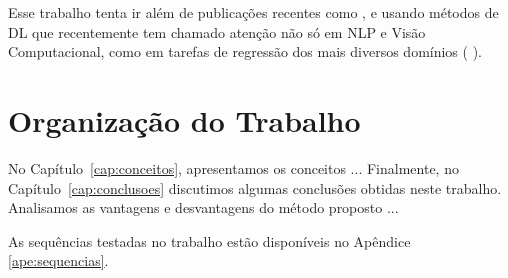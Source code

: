 Esse trabalho tenta ir além de publicações recentes como \citet{cementnn1}, \citet{cementnn2} e \citet{cementml} usando métodos de DL que recentemente tem chamado atenção não só em NLP e Visão Computacional, como em tarefas de regressão dos mais diversos domínios (\cite{ubertime} \cite{lstmbr} \cite{energylstm}). 

\section{Organização do Trabalho}
\label{sec:organizacao_trabalho}

No Capítulo~\ref{cap:conceitos}, apresentamos os conceitos ... Finalmente, no
Capítulo~\ref{cap:conclusoes} discutimos algumas conclusões obtidas neste
trabalho. Analisamos as vantagens e desvantagens do método proposto ... 

As sequências testadas no trabalho estão disponíveis no Apêndice \ref{ape:sequencias}.
